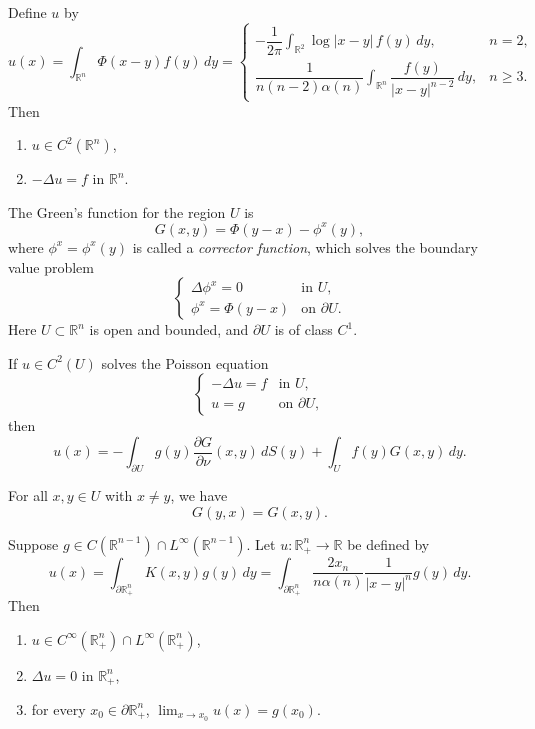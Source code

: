 \begin{theorem}
Define $u$ by
$$
u(x)=\int_{\mathbb{R}^n}\Phi(x-y)f(y)\,dy
=
\begin{cases}
-\dfrac{1}{2\pi}\displaystyle\int_{\mathbb{R}^2}\log|x-y|\,f(y)\,dy, & n=2,\\[1.2em]
\dfrac{1}{n(n-2)\alpha(n)}
\displaystyle\int_{\mathbb{R}^n}\dfrac{f(y)}{|x-y|^{n-2}}\,dy, & n\ge 3.
\end{cases}
$$
Then
\begin{enumerate}
    \item $u\in C^2(\mathbb{R}^n)$,
    \item $-\Delta u=f$ in $\mathbb{R}^n$.
\end{enumerate}
\end{theorem}

\begin{definition}
The Green's function for the region $U$ is
$$
G(x,y)=\Phi(y-x)-\phi^x(y),
$$
where $\phi^x=\phi^x(y)$ is called a \emph{corrector function}, which solves the boundary value problem
$$
\begin{cases}
\Delta \phi^x = 0 & \text{in } U,\\
\phi^x = \Phi(y-x) & \text{on } \partial U.
\end{cases}
$$
Here $U\subset \mathbb{R}^n$ is open and bounded, and $\partial U$ is of class $C^1$.
\end{definition}

\begin{theorem}
If $u\in C^2(U)$ solves the Poisson equation
$$
\begin{cases}
-\Delta u=f & \text{in } U,\\
u=g & \text{on } \partial U,
\end{cases}
$$
then
$$
u(x)
=
-\int_{\partial U} g(y)\frac{\partial G}{\partial \nu}(x,y)\,dS(y)
+
\int_U f(y)G(x,y)\,dy.
$$
\end{theorem}

\begin{theorem}
For all $x,y\in U$ with $x\neq y$, we have
$$
G(y,x)=G(x,y).
$$
\end{theorem}

\begin{theorem}
Suppose
$
g\in C(\mathbb{R}^{n-1})\cap L^\infty(\mathbb{R}^{n-1}).
$
Let $u:\mathbb{R}_+^n\to \mathbb{R}$ be defined by
$$
u(x)=\int_{\partial \mathbb{R}_+^n} K(x,y)g(y)\,dy
=
\int_{\partial \mathbb{R}_+^n}
\frac{2x_n}{n\alpha(n)}
\frac{1}{|x-y|^n}g(y)\,dy.
$$
Then
\begin{enumerate}
    \item $u\in C^\infty(\mathbb{R}_+^n)\cap L^\infty(\mathbb{R}_+^n)$,
    \item $\Delta u=0$ in $\mathbb{R}_+^n$,
    \item for every $x_0\in \partial \mathbb{R}_+^n$,
    $
    \lim_{x\to x_0}u(x)=g(x_0).
    $
\end{enumerate}
\end{theorem}

